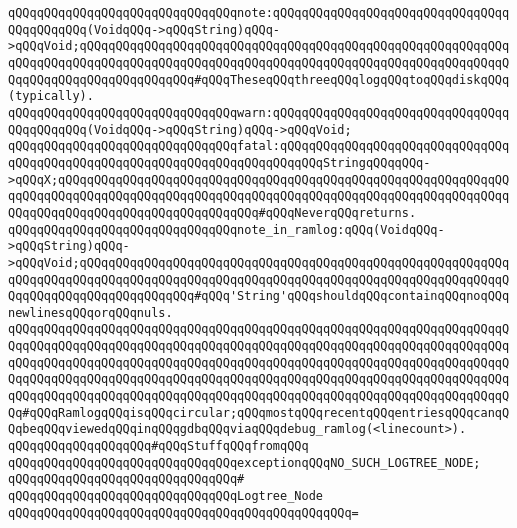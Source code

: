 \newline
\verb|qQQqqQQqqQQqqQQqqQQqqQQqqQQqqQQqnote:qQQqqQQqqQQqqQQqqQQqqQQqqQQqqQQqqQQqqQQqqQQq(VoidqQQq->qQQqString)qQQq->qQQqVoid;qQQqqQQqqQQqqQQqqQQqqQQqqQQqqQQqqQQqqQQqqQQqqQQqqQQqqQQqqQQqqQQqqQQqqQQqqQQqqQQqqQQqqQQqqQQqqQQqqQQqqQQqqQQqqQQqqQQqqQQqqQQqqQQqqQQqqQQqqQQqqQQqqQQqqQQqqQQq#qQQqTheseqQQqthreeqQQqlogqQQqtoqQQqdiskqQQq(typically).|\newline
\verb|qQQqqQQqqQQqqQQqqQQqqQQqqQQqqQQqwarn:qQQqqQQqqQQqqQQqqQQqqQQqqQQqqQQqqQQqqQQqqQQq(VoidqQQq->qQQqString)qQQq->qQQqVoid;|\newline
\verb|qQQqqQQqqQQqqQQqqQQqqQQqqQQqqQQqfatal:qQQqqQQqqQQqqQQqqQQqqQQqqQQqqQQqqQQqqQQqqQQqqQQqqQQqqQQqqQQqqQQqqQQqqQQqqQQqStringqQQqqQQq->qQQqX;qQQqqQQqqQQqqQQqqQQqqQQqqQQqqQQqqQQqqQQqqQQqqQQqqQQqqQQqqQQqqQQqqQQqqQQqqQQqqQQqqQQqqQQqqQQqqQQqqQQqqQQqqQQqqQQqqQQqqQQqqQQqqQQqqQQqqQQqqQQqqQQqqQQqqQQqqQQqqQQqqQQqqQQq#qQQqNeverqQQqreturns.|\newline
\newline
\verb|qQQqqQQqqQQqqQQqqQQqqQQqqQQqqQQqnote_in_ramlog:qQQq(VoidqQQq->qQQqString)qQQq->qQQqVoid;qQQqqQQqqQQqqQQqqQQqqQQqqQQqqQQqqQQqqQQqqQQqqQQqqQQqqQQqqQQqqQQqqQQqqQQqqQQqqQQqqQQqqQQqqQQqqQQqqQQqqQQqqQQqqQQqqQQqqQQqqQQqqQQqqQQqqQQqqQQqqQQqqQQqqQQqqQQq#qQQq'String'qQQqshouldqQQqcontainqQQqnoqQQqnewlinesqQQqorqQQqnuls.|\newline
\verb|qQQqqQQqqQQqqQQqqQQqqQQqqQQqqQQqqQQqqQQqqQQqqQQqqQQqqQQqqQQqqQQqqQQqqQQqqQQqqQQqqQQqqQQqqQQqqQQqqQQqqQQqqQQqqQQqqQQqqQQqqQQqqQQqqQQqqQQqqQQqqQQqqQQqqQQqqQQqqQQqqQQqqQQqqQQqqQQqqQQqqQQqqQQqqQQqqQQqqQQqqQQqqQQqqQQqqQQqqQQqqQQqqQQqqQQqqQQqqQQqqQQqqQQqqQQqqQQqqQQqqQQqqQQqqQQqqQQqqQQqqQQqqQQqqQQqqQQqqQQqqQQqqQQqqQQqqQQqqQQqqQQqqQQqqQQqqQQqqQQqqQQqqQQqqQQq#qQQqRamlogqQQqisqQQqcircular;qQQqmostqQQqrecentqQQqentriesqQQqcanqQQqbeqQQqviewedqQQqinqQQqgdbqQQqviaqQQqdebug_ramlog(<linecount>).|\newline
\newline
\verb|qQQqqQQqqQQqqQQqqQQq#qQQqStuffqQQqfromqQQq|\newline
\newline
\verb|qQQqqQQqqQQqqQQqqQQqqQQqqQQqqQQqexceptionqQQqNO_SUCH_LOGTREE_NODE;|\newline
\verb|qQQqqQQqqQQqqQQqqQQqqQQqqQQqqQQq#|\newline
\verb|qQQqqQQqqQQqqQQqqQQqqQQqqQQqqQQqLogtree_Node|\newline
\verb|qQQqqQQqqQQqqQQqqQQqqQQqqQQqqQQqqQQqqQQqqQQqqQQq=|\newline
